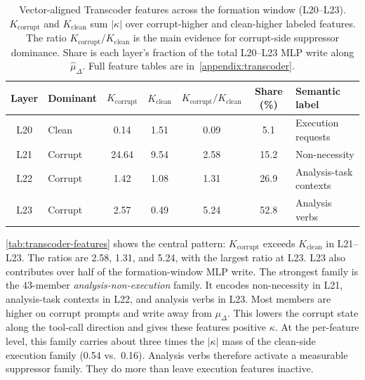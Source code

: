 \documentclass{article}
\begin{document}
\begin{table}[h]
\vspace{-3pt}
\centering
\small
\caption{Vector-aligned Transcoder features across the formation window (L20--L23). $K_{\mathrm{corrupt}}$ and $K_{\mathrm{clean}}$ sum $|\kappa|$ over corrupt-higher and clean-higher labeled features. The ratio $K_{\mathrm{corrupt}}/K_{\mathrm{clean}}$ is the main evidence for corrupt-side suppressor dominance. Share is each layer's fraction of the total L20--L23 MLP write along $\hat{\mu}_\Delta$. Full feature tables are in~\autoref{appendix:transcoder}.}
\label{tab:transcoder-features}
\begin{tabularx}{\linewidth}{clccccX}
\toprule
Layer & Dominant & $K_{\mathrm{corrupt}}$ & $K_{\mathrm{clean}}$ & $K_{\mathrm{corrupt}}/K_{\mathrm{clean}}$ & Share (\%) & Semantic label \\
\midrule
L20 & Clean   & 0.14  & 1.51  & 0.09 & 5.1  & Execution requests \\[2pt]
L21 & Corrupt & 24.64 & 9.54  & 2.58 & 15.2 & Non-necessity \\[2pt]
L22 & Corrupt & 1.42  & 1.08  & 1.31 & 26.9 & Analysis-task contexts \\[2pt]
L23 & Corrupt & 2.57  & 0.49  & 5.24 & 52.8 & Analysis verbs \\
\bottomrule
\end{tabularx}
\vspace{-3pt}
\end{table}


\autoref{tab:transcoder-features} shows the central pattern:
$K_{\mathrm{corrupt}}$ exceeds $K_{\mathrm{clean}}$ in L21--L23.
The ratios are 2.58, 1.31, and 5.24, with the largest ratio at L23.
L23 also contributes over half of the formation-window MLP write.
The strongest family is the 43-member \emph{analysis-non-execution} family.
It encodes non-necessity in L21, analysis-task contexts in L22, and analysis
verbs in L23. Most members are higher on corrupt prompts and write away from
$\mu_\Delta$. This lowers the corrupt state along the tool-call direction and
gives these features positive $\kappa$. At the per-feature level, this family
carries about three times the $|\kappa|$ mass of the clean-side execution
family (0.54 vs.\ 0.16). Analysis verbs therefore activate a measurable
suppressor family. They do more than leave execution features inactive.
\end{document}
